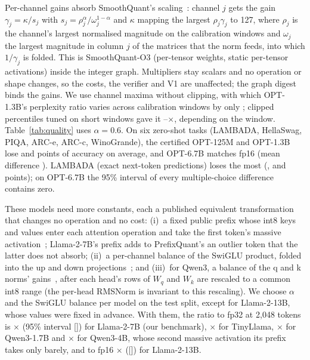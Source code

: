  Per-channel gains absorb SmoothQuant's
scaling~\cite{xiao2023smoothquant}: channel $j$ gets the gain $\gamma_j=\kappa/s_j$ with
$s_j=\rho_j^{\alpha}/\omega_j^{1-\alpha}$ and $\kappa$ mapping the largest $\rho_j\gamma_j$ to 127, where $\rho_j$ is the channel's largest normalised
magnitude on the calibration windows and $\omega_j$ the largest magnitude in column $j$ of the
matrices that the norm feeds, into which $1/\gamma_j$ is folded. This is SmoothQuant-O3 (per-tensor
weights, static per-tensor activations) inside the integer graph. Multipliers stay scalars and no
operation or shape changes, so the costs, the verifier and V1 are unaffected; the graph digest binds
the gains. We use channel maxima without clipping, with which OPT-1.3B's perplexity ratio varies
across calibration windows by only \QualityDrawSpread{}; clipped percentiles tuned on short windows
gave it \QualityLegacyLo{}--\QualityLegacyHi{}$\times$, depending on the window. Table~\ref{tab:quality} uses $\alpha=0.6$. On six zero-shot tasks (LAMBADA, HellaSwag, PIQA, ARC-e, ARC-c,
WinoGrande), the certified OPT-125M and OPT-1.3B lose \ZeroshotMeanOptS{} and \ZeroshotMeanOptM{} points of accuracy on average,
and OPT-6.7B matches fp16 (mean difference \ZeroshotMeanOptL{}). LAMBADA (exact next-token predictions) loses the
most (\ZeroshotLambadaOptS{}, \ZeroshotLambadaOptM{} and \ZeroshotLambadaOptL{} points); on OPT-6.7B the 95\% interval of every
multiple-choice difference contains zero.

 These models need more constants, each a published equivalent
transformation that changes no operation and no cost: (i)~a fixed public prefix whose int8 keys and
values enter each attention operation and take the first token's massive
activation~\cite{chen2024prefixquant,son2024cushioncache}; Llama-2-7B's prefix adds to PrefixQuant's an
outlier token that the latter does not absorb; (ii)~a per-channel balance of the SwiGLU product, folded into the
up and down projections~\cite{xiao2023smoothquant,lin2024awq}; and (iii)~for Qwen3, a balance of the
q and k norms' gains~\cite{shao2024omniquant}, after each head's rows of $W_q$ and $W_k$ are rescaled
to a common int8 range (the per-head RMSNorm is invariant to this rescaling). We choose $\alpha$ and the SwiGLU balance per model on the test split, except for Llama-2-13B, whose
values were fixed in advance. With them, the ratio to fp32 at 2{,}048 tokens is \LlamaSevenRatio{}$\times$ (95\% interval [\LlamaSevenCI{}]) for Llama-2-7B (our benchmark),
\TinyLlamaRatio{}$\times$ for TinyLlama, \QwenMRatio{}$\times$ for Qwen3-1.7B and \QwenLRatio{}$\times$ for Qwen3-4B, whose
second massive activation its prefix takes only barely, and to fp16 \LlamaThirteenRatio{}$\times$ ([\LlamaThirteenCI{}]) for Llama-2-13B.


